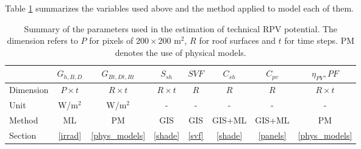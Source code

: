 Table \ref{tab:vars} summarizes the variables used above and the method applied to model each of them. 

\begin{table}[tb]
\centering
\footnotesize
\caption{Summary of the parameters used in the estimation of technical RPV potential. The dimension refers to $P$ for pixels of $200 \times 200$ m$^2$, $R$ for roof surfaces and $t$ for time steps. PM denotes the use of physical models.}
\label{tab:vars}
\begin{tabular} {lccccccc} %
\hline 
  & $G_{h,B,D}$ & $G_{Bt,Dt,Rt}$ & $S_{sh}$   & $\mathit{SVF}$  & $C_{sh}$  & $C_{\mathit{pv}}$ & $\eta_{PV}, \mathit{PF}$     
  \\
\hline 
Dimension & $P \times t$ & $R \times t$ & $R \times t$ & $R$   & $R$     & $R$      & $R \times t$  
\\
Unit     & W/m$^2$    & W/m$^2$  & -                          & -                  & -                    & -                     & -                             
\\
Method      & ML & PM & GIS & GIS & GIS+ML & GIS+ML & PM \\
Section      & \ref{irrad}  & \ref{phys_models}     & \ref{shade}       & \ref{svf} & \ref{shade} & \ref{panels} & \ref{phys_models} 
\\  
\hline 
\end{tabular}
\end{table}

